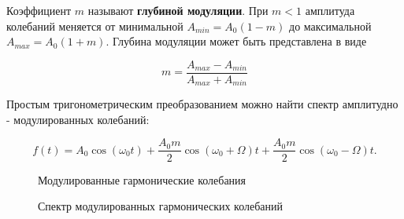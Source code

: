\documentclass[a4paper, 12pt]{article}
\begin{document}
                Коэффициент $m$ называют \textbf{глубиной модуляции}. При $m<1$ амплитуда колебаний меняется от минимальной $A_{min}=A_{0}(1-m)$ до максимальной $A_{max}=A_{0}(1+m).$ Глубина модуляции может быть представлена в виде

                \begin{equation}\label{m}
                    m=\dfrac{A_{max}-A_{min}}{A_{max}+A_{min}}
                \end{equation}

                Простым тригонометрическим преобразованием можно найти спектр амплитудно - модулированных колебаний:

                \begin{equation}\label{a}
                    f(t)=A_{0}\cos(\omega_{0} t)+\dfrac{A_{0}m}{2}\cos(\omega_{0}+\Omega)t+\dfrac{A_{0}m}{2}\cos(\omega_{0}-\Omega)t.
                \end{equation}

                \begin{figure}[ht]
                    \begin{minipage}[ht]{0.45\linewidth}
                        \caption{Модулированные гармонические колебания}
                    \end{minipage}
                    \begin{minipage}[ht]{0.45\linewidth}
                        \caption{Спектр модулированных гармонических колебаний}
                    \end{minipage}
                \end{figure}
\end{document}
